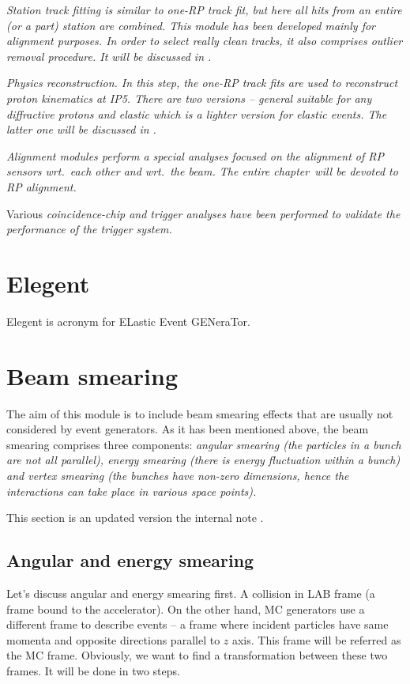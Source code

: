 \em{Station track fitting} is similar to one-RP track fit, but here all hits from an entire (or a part) station are combined. This module has been developed mainly for alignment purposes. In order to select really clean tracks, it also comprises outlier removal procedure. It will be discussed in .

\em{Physics reconstruction}.
In this step, the one-RP track fits are used to reconstruct proton kinematics at IP5. There are two versions -- \em{general} suitable for any diffractive protons and \em{elastic} which is a lighter version for elastic events. The latter one will be discussed in .

\em{Alignment} modules perform a special analyses focused on the alignment of RP sensors wrt.~each other and wrt.~the beam. The entire chapter~will be devoted to RP alignment.

Various \em{coincidence-chip and trigger analyses} have been performed to validate the performance of the trigger system.

\section[elegent]{Elegent}

Elegent is acronym for ELastic Event GENeraTor.

\section[beam smearing]{Beam smearing}

The aim of this module is to include beam smearing effects that are usually not considered by event generators. As it has been mentioned above, the beam smearing comprises three components: \em{angular smearing} (the particles in a bunch are not all parallel), \em{energy smearing} (there is energy fluctuation within a bunch) and \em{vertex smearing} (the bunches have non-zero dimensions, hence the interactions can take place in various space points).

This section is an updated version the internal note .


\subsection{Angular and energy smearing}

Let's discuss angular and energy smearing first. A collision in LAB frame (a frame bound to the accelerator). On the other hand, MC generators use a different frame to describe events -- a frame where incident particles have same momenta and opposite directions parallel to $z$ axis. This frame will be referred as the MC frame. Obviously, we want to find a transformation between these two frames. It will be done in two steps. 

